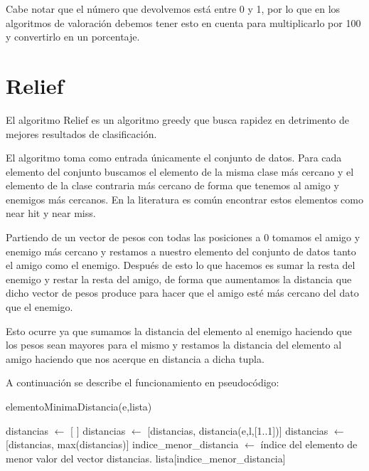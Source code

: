 \documentclass[12pt,a4paper]{article}
\begin{document}
	Cabe notar que el número que devolvemos está entre 0 y 1, por lo que en los algoritmos de valoración debemos tener esto en cuenta para multiplicarlo por 100 y convertirlo en un porcentaje.
	
	\section{Relief}
	\label{sec:relief}
	
	El algoritmo Relief es un algoritmo greedy que busca rapidez en detrimento de mejores resultados de clasificación.
	
	El algoritmo toma como entrada únicamente el conjunto de datos. Para cada elemento del conjunto buscamos el elemento de la misma clase más cercano y el elemento de la clase contraria más cercano de forma que tenemos al amigo y enemigos más cercanos. En la literatura es común encontrar estos elementos como near hit y near miss.
	
	Partiendo de un vector de pesos con todas las posiciones a 0 tomamos el amigo y enemigo más cercano y restamos a nuestro elemento del conjunto de datos tanto el amigo como el enemigo. Después de esto lo que hacemos es sumar la resta del enemigo y restar la resta del amigo, de forma que aumentamos la distancia que dicho vector de pesos produce para hacer que el amigo esté más cercano del dato que el enemigo.
	
	Esto ocurre ya que sumamos la distancia del elemento al enemigo haciendo que los pesos sean mayores para el mismo y restamos la distancia del elemento al amigo haciendo que nos acerque en distancia a dicha tupla.
	
	A continuación se describe el funcionamiento en pseudocódigo:
	
	\begin{algorithm}
		\caption{elementoMinimaDistancia(e,lista)}
		\begin{algorithmic}
			\STATE distancias $\leftarrow$ [ ]
			\STATE distancias $\leftarrow$ [distancias, distancia(e,l,[1..1])]
			\ELSE
			\STATE distancias $\leftarrow$ [distancias, max(distancias)]
			\ENDIF
			\ENDFOR
			\STATE indice\_menor\_distancia $\leftarrow$ índice del elemento de menor valor del vector distancias.
			\RETURN lista[indice\_menor\_distancia]
		\end{algorithmic}
	\end{algorithm}
	
\end{document}
